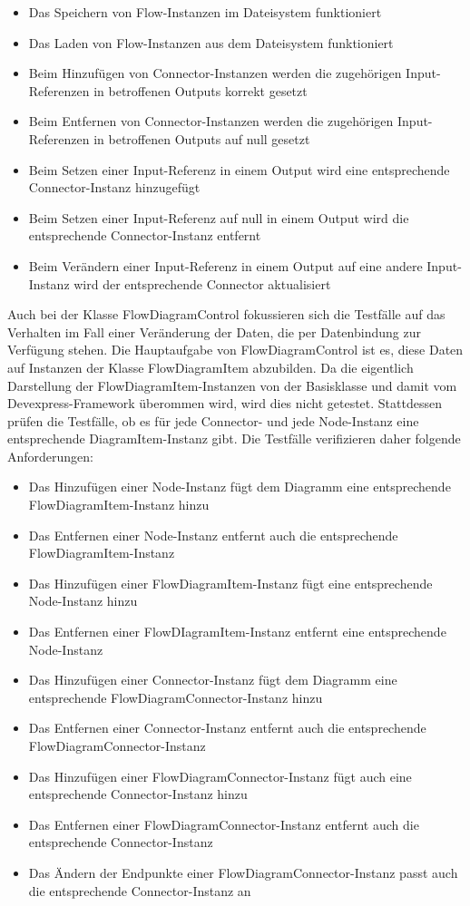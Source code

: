 \begin{itemize}
\item Das Speichern von Flow-Instanzen im Dateisystem funktioniert
\item Das Laden von Flow-Instanzen aus dem Dateisystem funktioniert
\item Beim Hinzufügen von Connector-Instanzen werden die zugehörigen Input-Referenzen in betroffenen Outputs korrekt gesetzt
\item Beim Entfernen von Connector-Instanzen werden die zugehörigen Input-Referenzen in betroffenen Outputs auf null gesetzt
\item Beim Setzen einer Input-Referenz in einem Output wird eine entsprechende Connector-Instanz hinzugefügt
\item Beim Setzen einer Input-Referenz auf null in einem Output wird die entsprechende Connector-Instanz entfernt
\item Beim Verändern einer Input-Referenz in einem Output auf eine andere Input-Instanz wird der entsprechende Connector aktualisiert 
\end{itemize}

Auch bei der Klasse FlowDiagramControl fokussieren sich die Testfälle auf das Verhalten im Fall einer Veränderung der Daten, die per Datenbindung zur Verfügung stehen. Die Hauptaufgabe von FlowDiagramControl ist es, diese Daten auf Instanzen der Klasse FlowDiagramItem abzubilden. Da die eigentlich Darstellung der FlowDiagramItem-Instanzen von der Basisklasse und damit vom Devexpress-Framework überommen wird, wird dies nicht getestet. Stattdessen prüfen die Testfälle, ob es für jede Connector- und jede Node-Instanz eine entsprechende DiagramItem-Instanz gibt. Die Testfälle verifizieren daher folgende Anforderungen:

\begin{itemize}
\item Das Hinzufügen einer Node-Instanz fügt dem Diagramm eine entsprechende Flow\-Diagram\-Item-In\-stanz hinzu
\item Das Entfernen einer Node-Instanz entfernt auch die entsprechende Flow\-Diagram\-Item-In\-stanz
\item Das Hinzufügen einer FlowDiagramItem-Instanz fügt eine entsprechende Node-Instanz hinzu
\item Das Entfernen einer FlowDIagramItem-Instanz entfernt eine entsprechende Node-Instanz
\item Das Hinzufügen einer Connector-Instanz fügt dem Diagramm eine entsprechende Flow\-Dia\-gram\-Con\-nec\-tor-In\-stanz hinzu
\item Das Entfernen einer Connector-Instanz entfernt auch die entsprechende Flow\-Dia\-gram\-Con\-nec\-tor-In\-stanz
\item Das Hinzufügen einer FlowDiagramConnector-Instanz fügt auch eine entsprechende Connector-Instanz hinzu
\item Das Entfernen einer FlowDiagramConnector-Instanz entfernt auch die entsprechende Connector-Instanz
\item Das Ändern der Endpunkte einer FlowDiagramConnector-Instanz passt auch die entsprechende Connector-Instanz an
\end{itemize} 

